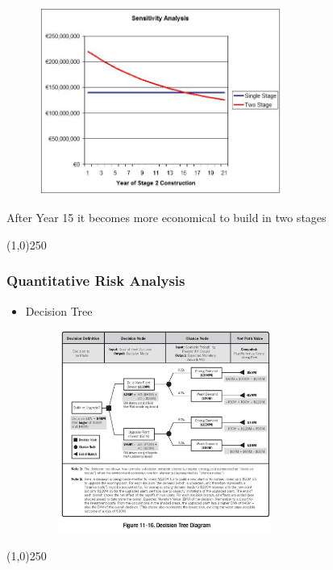 \begin{frame}
\frametitle{}
\begin{figure}
	\centering
		\includegraphics[width = 8cm]{images/sensgraph.jpg}
	\label{fig:sensgraph}
\end{figure}

After Year 15 it becomes more economical to build in two stages
\end{frame}\begin{center}\line(1,0){250}\end{center}





\begin{frame}
\frametitle{Quantitative Risk Analysis}
\begin{itemize}
\item Decision Tree
\begin{figure}
	\centering
		\includegraphics[width = 7cm]{images/Fig11-16.jpg}
	\label{fig:11-16}
\end{figure}
\end{itemize}
\end{frame}\begin{center}\line(1,0){250}\end{center}



